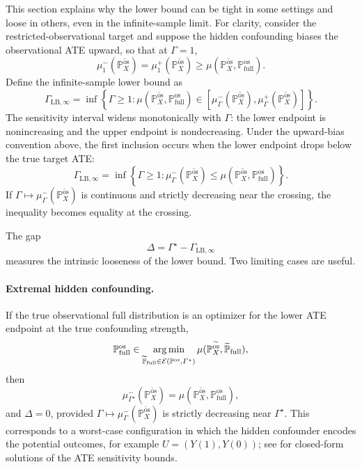 This section explains why the lower bound can be tight in some settings and loose in others, even in the infinite-sample limit. For clarity, consider the restricted-observational target and suppose the hidden confounding biases the observational ATE upward, so that at \(\Gamma=1\),
\[
  \mu^-_{1}(\mathbb{P}^{\widetilde{\mathrm{os}}}_X)
  =
  \mu^+_{1}(\mathbb{P}^{\widetilde{\mathrm{os}}}_X)
  \geq
  \mu(\mathbb{P}^{\widetilde{\mathrm{os}}}_X,\mathbb{P}^{\mathrm{os}}_{\mathrm{full}}).
\]
Define the infinite-sample lower bound as
\[
  \Gamma_{\mathrm{LB},\infty}
  =
  \inf
  \left\{
    \Gamma\geq 1:
    \mu(\mathbb{P}^{\widetilde{\mathrm{os}}}_X,\mathbb{P}^{\mathrm{os}}_{\mathrm{full}})
    \in
    [
      \mu^-_{\Gamma}(\mathbb{P}^{\widetilde{\mathrm{os}}}_X),
      \mu^+_{\Gamma}(\mathbb{P}^{\widetilde{\mathrm{os}}}_X)
    ]
  \right\}.
\]
The sensitivity interval widens monotonically with \(\Gamma\): the lower endpoint is nonincreasing and the upper endpoint is nondecreasing. Under the upward-bias convention above, the first inclusion occurs when the lower endpoint drops below the true target ATE:
\[
  \Gamma_{\mathrm{LB},\infty}
  =
  \inf
  \left\{
    \Gamma\geq 1:
    \mu^-_{\Gamma}(\mathbb{P}^{\widetilde{\mathrm{os}}}_X)
    \leq
    \mu(\mathbb{P}^{\widetilde{\mathrm{os}}}_X,\mathbb{P}^{\mathrm{os}}_{\mathrm{full}})
  \right\}.
\]
If \(\Gamma\mapsto \mu^-_{\Gamma}(\mathbb{P}^{\widetilde{\mathrm{os}}}_X)\) is continuous and strictly decreasing near the crossing, the inequality becomes equality at the crossing.

The gap
\[
  \Delta
  =
  \Gamma^\star-\Gamma_{\mathrm{LB},\infty}
\]
measures the intrinsic looseness of the lower bound. Two limiting cases are useful.

\paragraph{Extremal hidden confounding.}
If the true observational full distribution is an optimizer for the lower ATE endpoint at the true confounding strength,
\[
  \mathbb{P}^{\mathrm{os}}_{\mathrm{full}}
  \in
  \operatorname*{arg\,min}_{
    \widetilde{\mathbb{P}}_{\mathrm{full}}
    \in
    \mathcal{E}(\mathbb{P}^{\mathrm{os}},\Gamma^\star)
  }
  \mu(\mathbb{P}^{\widetilde{\mathrm{os}}}_X,\widetilde{\mathbb{P}}_{\mathrm{full}}),
\]
then
\[
  \mu^-_{\Gamma^\star}(\mathbb{P}^{\widetilde{\mathrm{os}}}_X)
  =
  \mu(\mathbb{P}^{\widetilde{\mathrm{os}}}_X,\mathbb{P}^{\mathrm{os}}_{\mathrm{full}}),
\]
and \(\Delta=0\), provided \(\Gamma\mapsto\mu^-_{\Gamma}(\mathbb{P}^{\widetilde{\mathrm{os}}}_X)\) is strictly decreasing near \(\Gamma^\star\). This corresponds to a worst-case configuration in which the hidden confounder encodes the potential outcomes, for example \(U=(Y(1),Y(0))\); see \citet{dorn2022sharp} for closed-form solutions of the ATE sensitivity bounds.

